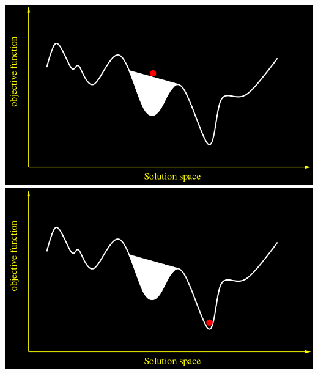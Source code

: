 \documentclass[10pt,a4paper]{article}
\begin{document}
\includegraphics[scale=0.1]{guided-local-search4.png}
\includegraphics[scale=0.1]{guided-local-search5.png}
\end{document}
